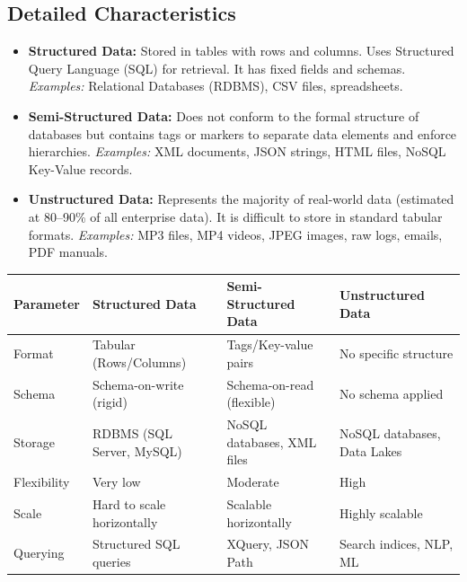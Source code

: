 \documentclass[12pt,a4paper]{article}
\renewcommand{\arraystretch}{1.45}
\begin{document}
\subsection{Detailed Characteristics}
\begin{itemize}[leftmargin=*, itemsep=4pt]
  \item \textbf{Structured Data:}
    Stored in tables with rows and columns. Uses Structured Query Language (SQL) for retrieval. It has fixed fields and schemas.
    \textit{Examples:} Relational Databases (RDBMS), CSV files, spreadsheets.
  \item \textbf{Semi-Structured Data:}
    Does not conform to the formal structure of databases but contains tags or markers to separate data elements and enforce hierarchies.
    \textit{Examples:} XML documents, JSON strings, HTML files, NoSQL Key-Value records.
  \item \textbf{Unstructured Data:}
    Represents the majority of real-world data (estimated at 80--90\% of all enterprise data). It is difficult to store in standard tabular formats.
    \textit{Examples:} MP3 files, MP4 videos, JPEG images, raw logs, emails, PDF manuals.
  \end{itemize}

\par\vspace{6pt}\noindent
{\renewcommand{\arraystretch}{1.4}%
\begin{tabularx}{\linewidth}{|B{2.8cm}|Y|Y|Y|}
\hline
\textbf{Parameter} & \textbf{Structured Data} & \textbf{Semi-Structured Data} & \textbf{Unstructured Data} \\
\hline
Format & Tabular (Rows/Columns) & Tags/Key-value pairs & No specific structure \\
\hline
Schema & Schema-on-write (rigid) & Schema-on-read (flexible) & No schema applied \\
\hline
Storage & RDBMS (SQL Server, MySQL) & NoSQL databases, XML files & NoSQL databases, Data Lakes \\
\hline
Flexibility & Very low & Moderate & High \\
\hline
Scale & Hard to scale horizontally & Scalable horizontally & Highly scalable \\
\hline
Querying & Structured SQL queries & XQuery, JSON Path & Search indices, NLP, ML \\
\hline
\end{tabularx}}

\end{document}
